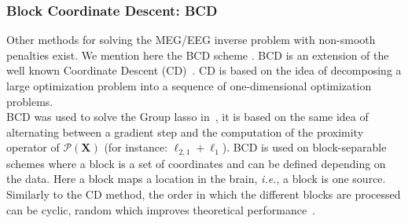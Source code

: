 

\subsubsection*{Block Coordinate Descent: BCD} \label{section:BCD}
Other methods for solving the MEG/EEG inverse problem with non-smooth penalties exist. We mention here the \ac{BCD} scheme \cite{tseng}. BCD is an extension of the well known Coordinate Descent (CD)~\cite{li-osher:2009,nesterov2012efficiency}. CD is based on the idea of decomposing a large optimization problem into a sequence of one-dimensional optimization problems. \\

BCD was used to solve the Group \ac{lasso} in~\cite{rakotomamonjy2011surveying,qin2013efficient}, it is based on the same idea of alternating between a gradient step and the computation of the proximity operator of $\mathcal{P}(\mathbf{X})$ (for instance: $\ell_{2,1}+\ell_1$). BCD is used on block-separable schemes where a block is a set of coordinates and can be defined depending on the data. Here a block maps a location in the brain, \textit{i.e.}, a block is one source. Similarly to the CD method, the order in which the different blocks are processed can be cyclic, random which improves theoretical performance~\cite{tseng2001convergence,wei2012doa}. \\

